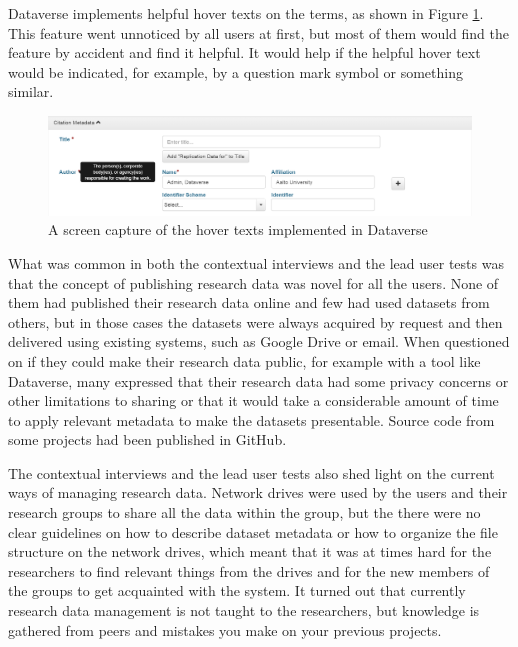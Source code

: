 Dataverse implements helpful hover texts on the terms, as shown in Figure
\ref{fig:hovertext}. This feature went unnoticed by all users at first, but
most of them would find the feature by accident and find it helpful. It would
help if the helpful hover text would be indicated, for example, by a question
mark symbol or something similar.

\begin{figure}
    \begin{centering}
        \includegraphics[width=\textwidth]{images/hovertext}
    \end{centering}
    \caption{A screen capture of the hover texts implemented in Dataverse}
    \label{fig:hovertext}
\end{figure}

What was common in both the contextual interviews and the lead user tests was
that the concept of publishing research data was novel for all the users. None
of them had published their research data online and few had used datasets from others,
but in those cases the datasets were always acquired by request and then
delivered using existing systems, such as Google Drive or email. When 
questioned on if they could make their research data public, for example with a tool
like Dataverse, many expressed that their research data had some privacy
concerns or other limitations to sharing or that it would take a considerable
amount of time to apply relevant metadata to make the datasets presentable.
Source code from some projects had been published in GitHub.

The contextual interviews and the lead user tests also shed light on the
current ways of managing research data. Network drives were used by the
users and their research groups to share all the data within the group, but
the there were no clear guidelines on how to describe dataset metadata or how
to organize the file structure on the network drives, which meant that it was
at times hard for the researchers to find relevant things from the drives and
for the new members of the groups to get acquainted with the system. It turned
out that currently research data management is not taught to the researchers,
but knowledge is gathered from peers and mistakes you make on your previous
projects.

